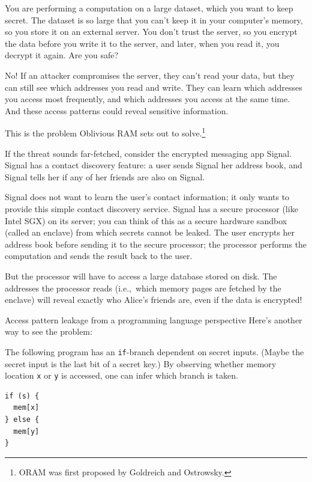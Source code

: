 \newcommand{\op}{{\texttt{op}}}
\newcommand{\addr}{{\texttt{addr}}}
\newcommand{\data}{{\texttt{data}}}

You are performing a computation on a large dataset, which you want to keep secret.
The dataset is so large that you can't keep it in your computer's memory, so you store it on an external server.
You don't trust the server, so you encrypt the data before you write it to the server, and later, when you read it, you decrypt it again.
Are you safe?

No!  If an attacker compromises the server, they can't read your data, but they can still see which addresses you read and write.
They can learn which addresses you access most frequently, and which addresses you access at the same time.
And these access patterns could reveal sensitive information.

This is the problem \alert{Oblivious RAM} sets out to solve.\footnote{ORAM was first proposed by Goldreich and Ostrowsky.}

If the threat sounds far-fetched, consider the encrypted messaging app Signal.
Signal has a contact discovery feature: a user sends Signal her address book,
and Signal tells her if any of her friends are also on Signal.

Signal does not want to learn the user's contact information; it only wants to provide this simple contact discovery service.
Signal has a secure processor (like Intel SGX) on its server; you can think of this as a secure hardware sandbox (called an \alert{enclave})
from which secrets cannot be leaked.
The user encrypts her address book before sending it to the secure processor;
the processor performs the computation and sends the result back to the user.

But the processor will have to access a large database stored on disk.
The addresses the processor reads (i.e.,\ which memory pages are fetched by the enclave) will reveal
exactly who Alice's friends are, even if the data is encrypted!

\begin{remark}{Access pattern leakage from a programming language perspective}{}
Here's another way to see the problem:

The following program has an
\texttt{if}-branch dependent on secret inputs. (Maybe the secret input
is the last bit of a secret key.) By observing whether memory location
\texttt{x} or \texttt{y} is accessed, one can infer which branch is
taken.

\begin{center}
\begin{minipage}{22mm}
\begin{verbatim}
if (s) {
  mem[x]
} else {
  mem[y]
}
\end{verbatim}
\end{minipage}
\end{center}
\end{remark}

